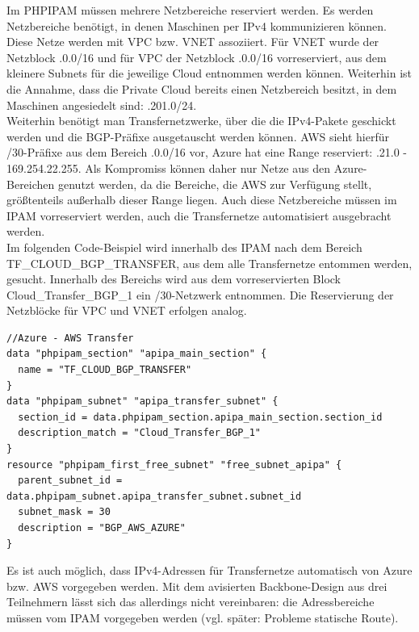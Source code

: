 Im PHPIPAM müssen mehrere Netzbereiche reserviert werden. Es werden Netzbereiche benötigt, in denen Maschinen per IPv4 kommunizieren können. Diese Netze werden mit VPC bzw. VNET assoziiert. Für VNET wurde der Netzblock .0.0/16\grqq{} und für VPC der Netzblock .0.0/16\grqq{} vorreserviert, aus dem kleinere {Subnets} für die jeweilige Cloud entnommen werden können. Weiterhin ist die Annahme, dass die Private Cloud bereits einen Netzbereich besitzt, in dem Maschinen angesiedelt sind: .201.0/24.\grgg{}\\
Weiterhin benötigt man {Transfernetzwerke}, über die die IPv4-Pakete geschickt werden und die BGP-Präfixe ausgetauscht werden können. AWS sieht hierfür /30-Präfixe aus dem Bereich .0.0/16\grqq{} vor, Azure hat eine Range reserviert: .21.0 - 169.254.22.255\grqq{}. Als Kompromiss können daher nur Netze aus den Azure-Bereichen genutzt werden, da die Bereiche, die AWS zur Verfügung stellt, größtenteils außerhalb dieser Range liegen. Auch diese Netzbereiche müssen im IPAM vorreserviert werden, auch die Transfernetze automatisiert ausgebracht werden.\\
Im folgenden Code-Beispiel wird innerhalb des IPAM nach dem Bereich \glqq TF\_CLOUD\_BGP\_TRANSFER\grqq{}, aus dem alle Transfernetze entommen werden, gesucht. Innerhalb des Bereichs wird aus dem vorreservierten Block \glqq Cloud\_Transfer\_BGP\_1\grqq{} ein /30-Netzwerk entnommen. Die Reservierung der Netzblöcke für VPC und VNET erfolgen analog.
\FloatBarrier
\begin{lstlisting}[float,label=network-reservation-ip,caption=Die data-Anweisungen dienen ausschließlich der Suche nach dem passenden Transfernetzwerk-Block. Per resource-Anweisung wird ein /30-Netzwerk reserviert.]
//Azure - AWS Transfer
data "phpipam_section" "apipa_main_section" {
  name = "TF_CLOUD_BGP_TRANSFER"
}
data "phpipam_subnet" "apipa_transfer_subnet" {
  section_id = data.phpipam_section.apipa_main_section.section_id
  description_match = "Cloud_Transfer_BGP_1"
} 
resource "phpipam_first_free_subnet" "free_subnet_apipa" {
  parent_subnet_id = data.phpipam_subnet.apipa_transfer_subnet.subnet_id
  subnet_mask = 30
  description = "BGP_AWS_AZURE"
}
\end{lstlisting}
\FloatBarrier
Es ist auch möglich, dass IPv4-Adressen für Transfernetze automatisch von Azure bzw. AWS vorgegeben werden. Mit dem avisierten Backbone-Design aus drei Teilnehmern lässt sich das allerdings nicht vereinbaren: die Adressbereiche müssen vom IPAM vorgegeben werden (vgl. später: Probleme statische Route).\\
